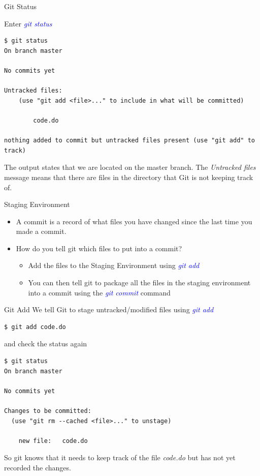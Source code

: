 \documentclass[11pt]{beamer}
\begin{document}
\begin{frame}[fragile]{Git Status}

Enter \textcolor{blue}{\emph{git status}}
\begin{lstlisting}
$ git status
On branch master

No commits yet

Untracked files:
	(use "git add <file>..." to include in what will be committed)

		code.do

nothing added to commit but untracked files present (use "git add" to track)
\end{lstlisting}
The output states that we are located on the master branch. The \emph{Untracked files} message means that there are files in the directory that Git is not keeping track of.
\end{frame}
\begin{frame}[fragile]{Staging Environment}
\begin{itemize}
	\item  A commit is a record of what files you have changed since the last time you made a commit.
 	\item How do you tell git which files to put into a commit?
	\begin{itemize}
		\item Add the files to the Staging Environment using \textcolor{blue}{\emph{git add}}
		\item You can then tell git to package all the files in the staging environment into a commit using the \textcolor{blue}{\emph{git commit}} command
	\end{itemize}
	
\end{itemize}
\end{frame}
\begin{frame}[fragile]{Git Add}
We tell Git to stage untracked/modified files using \textcolor{blue}{\emph{git add}}
\begin{lstlisting}
$ git add code.do
\end{lstlisting}
and check the status again
\begin{lstlisting}
$ git status
On branch master

No commits yet

Changes to be committed:
  (use "git rm --cached <file>..." to unstage)

	new file:   code.do
\end{lstlisting}

So git knows that it needs to keep track of the file \emph{code.do} but has not yet recorded the changes. 
\end{frame}
\end{document}
